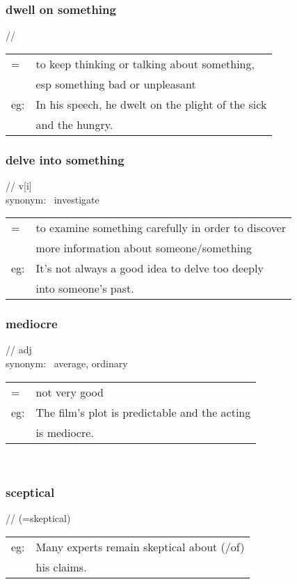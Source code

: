 \documentclass[14pt, t]{beamer}
\begin{document}
\begin{frame}
\frametitle{dwell on something}
// \\[8pt]
\begin{tabular}{ll}
= & to keep thinking or talking about something, \\[1pt]
	&  esp something bad or unpleasant \\[8pt]
eg: & In his speech, he dwelt on the plight of the sick\\[1pt]
	& and the hungry.
\end{tabular}
\end{frame}
\begin{frame}
\frametitle{delve into something}
// \quad v[i] \\[8pt]
synonym: \, investigate \\[8pt]
\begin{tabular}{ll}
= & to examine something carefully in order to discover \\[1pt]
	& more information about someone/something \\[8pt]
eg: & It's not always a good idea to delve too deeply \\[1pt]
	& into someone's past. 
\end{tabular}
\end{frame}
\begin{frame}
\frametitle{mediocre}
// \quad adj \\[8pt]
synonym: \, average, ordinary \\[8pt]
\begin{tabular}{ll}
= & not very good \\[8pt]
eg: & The film's plot is predictable and the acting \\[1pt]
	& is mediocre. 
\end{tabular} \\
\end{frame}
\begin{frame}
\frametitle{sceptical}
// \quad (=skeptical)\\[8pt]
\begin{tabular}{ll}
eg: & Many experts remain skeptical about (/of)\\[8pt]
	& his claims.  
\end{tabular} \\
\end{frame}
\end{document}
